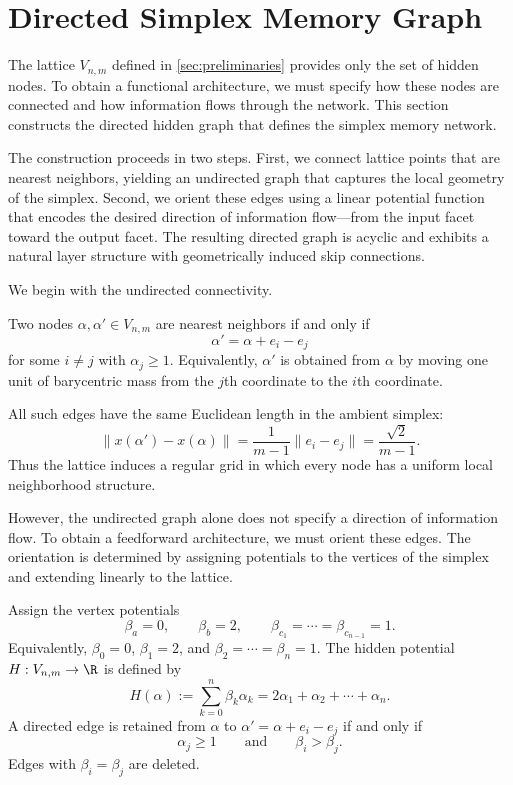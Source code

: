 \section{Directed Simplex Memory Graph}
\label{sec:directed_graph}

The lattice $V_{n,m}$ defined in \cref{sec:preliminaries} provides only the set of hidden nodes. To obtain a functional architecture, we must specify how these nodes are connected and how information flows through the network. This section constructs the directed hidden graph that defines the simplex memory network.

The construction proceeds in two steps. First, we connect lattice points that are nearest neighbors, yielding an undirected graph that captures the local geometry of the simplex. Second, we orient these edges using a linear potential function that encodes the desired direction of information flow---from the input facet toward the output facet. The resulting directed graph is acyclic and exhibits a natural layer structure with geometrically induced skip connections.

We begin with the undirected connectivity.

\begin{definition}
Two nodes $\alpha,\alpha'\in V_{n,m}$ are nearest neighbors if and only if
\[
\alpha' = \alpha + e_i - e_j
\]
for some $i\neq j$ with $\alpha_j\geq 1$. Equivalently, $\alpha'$ is obtained from $\alpha$ by moving one unit of barycentric mass from the $j$th coordinate to the $i$th coordinate.
\end{definition}

All such edges have the same Euclidean length in the ambient simplex:
\[
\|x(\alpha')-x(\alpha)\| = \frac{1}{m-1}\|e_i-e_j\| = \frac{\sqrt{2}}{m-1}.
\]
Thus the lattice induces a regular grid in which every node has a uniform local neighborhood structure.

However, the undirected graph alone does not specify a direction of information flow. To obtain a feedforward architecture, we must orient these edges. The orientation is determined by assigning potentials to the vertices of the simplex and extending linearly to the lattice.

\begin{definition}
Assign the vertex potentials
\[
\beta_a=0,
\qquad
\beta_b=2,
\qquad
\beta_{c_1}=\cdots=\beta_{c_{n-1}}=1.
\]
Equivalently, $\beta_0=0$, $\beta_1=2$, and $\beta_2=\cdots=\beta_n=1$. The hidden potential $H: V_{n,m} \to \R$ is defined by
\[
H(\alpha) := \sum_{k=0}^n \beta_k\alpha_k = 2\alpha_1 + \alpha_2 + \cdots + \alpha_n.
\]
A directed edge is retained from $\alpha$ to $\alpha' = \alpha + e_i - e_j$ if and only if
\[
\alpha_j\geq 1
\qquad\text{and}\qquad
\beta_i > \beta_j.
\]
Edges with $\beta_i=\beta_j$ are deleted.
\end{definition}

